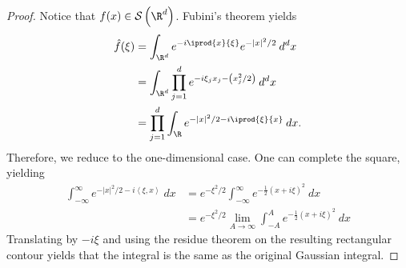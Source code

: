 \documentclass[10pt]{mypackage}
\begin{document}
\begin{proof}
  Notice that $f(x)\in \mathcal{S}\left( \R^d \right)$. Fubini's theorem yields
  \begin{align*}
    \hat{f}(\xi) &= \int_{\R^d}^{} e^{-i \iprod{x}{\xi}} e^{-\left\vert x \right\vert^2/2}\:d^{d}x\\
                 &= \int_{\R^d}^{} \prod_{j=1}^{d}e^{-i\xi_jx_j-\left( x_j^2/2 \right)}\:d^{d}x\\
                 &= \prod_{j=1}^{d} \int_{\R}^{} e^{-\left\vert x \right\vert^2/2 - i \iprod{\xi}{x}}\:dx.
  \end{align*}
  Therefore, we reduce to the one-dimensional case. One can complete the square, yielding
  \begin{align*}
    \int_{-\infty}^{\infty} e^{-\left\vert x \right\vert^2/2 - i\left\langle \xi, x \right\rangle}\:dx &= e^{-\xi^2/2} \int_{-\infty}^{\infty} e^{-\frac{1}{2}\left( x + i\xi \right)^2}\:dx\\
                                                    &= e^{-\xi^2/2} \lim_{A\rightarrow\infty}\int_{-A}^{A} e^{-\frac{1}{2}\left( x + i\xi \right)^2}\:dx
  \end{align*}
  Translating by $-i\xi$ and using the residue theorem on the resulting rectangular contour yields that the integral is the same as the original Gaussian integral.


\end{proof}
\end{document}
